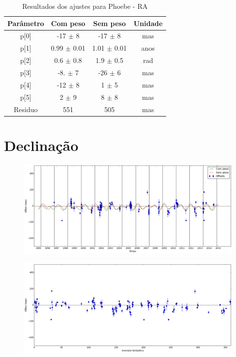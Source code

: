 \documentclass[11pt,a4paper]{report}
\begin{document}
\begin{table}[h!]
\caption{\label{Tab: Phoebe-RA} Resultados dos ajustes para Phoebe - RA}
\begin{centering}
\begin{tabular}{cccc}
\hline
\hline
Parâmetro & Com peso & Sem peso & Unidade\tabularnewline
\hline
p[0] & -17 $\pm$ 8 & -17 $\pm$ 8 & mas\\
p[1] & 0.99 $\pm$ 0.01 & 1.01 $\pm$ 0.01 & anos\\
p[2] & 0.6 $\pm$ 0.8 & 1.9 $\pm$ 0.5 & rad\\
p[3] & -8. $\pm$ 7 & -26 $\pm$ 6 & mas\\
p[4] & -12 $\pm$ 8 & 1 $\pm$ 5 & mas\\
p[5] & 2 $\pm$ 9 & 8 $\pm$ 8 & mas\\
Residuo & 551 & 505 & mas\\
\hline 
\end{tabular} 
\par\end{centering}
\end{table}

\section*{Declinação}

\begin{figure}[h]
\includegraphics[scale=0.35]{Phoebe/DEC.png} 
\end{figure}

\begin{figure}[h]
\includegraphics[scale=0.35]{Phoebe/DEC_anom.png}  
\end{figure}
\end{document}
